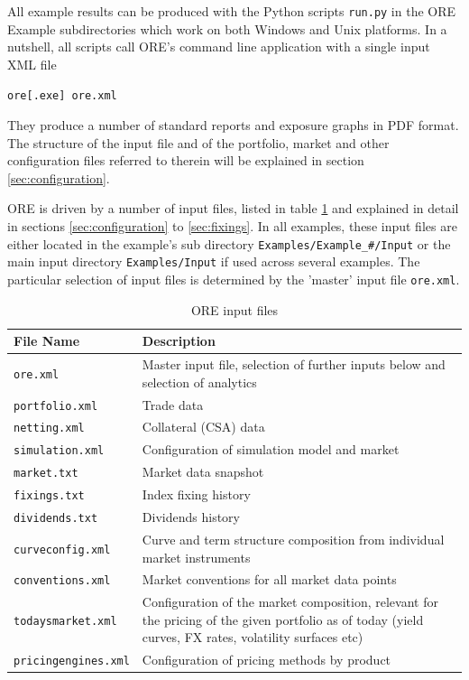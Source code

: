 All example results can be produced with the Python scripts {\tt run.py} in the ORE Example subdirectories
which work on both Windows and Unix platforms. In a nutshell, all scripts call ORE's command line application
with a single input XML file

\medskip
\centerline{\tt ore[.exe] ore.xml}
\medskip

They produce a number of standard reports and exposure graphs in PDF format. The structure of the input file and of the
portfolio, market and other configuration files referred to therein will be explained in section
\ref{sec:configuration}.

\medskip ORE is driven by a number of input files, listed in table \ref{tab_1} and explained in detail in sections
\ref{sec:configuration} to \ref{sec:fixings}. In all examples, these input files are either located in the example's sub
directory {\tt Examples/Example\_\#/Input} or the main input directory {\tt Examples/Input} if used across several
examples. The particular selection of input files is determined by the 'master' input file {\tt ore.xml}.

\begin{table}[h]
\scriptsize
\begin{center}
\begin{tabular}{|l|p{11cm}|}
  \hline
  File Name & Description \\
  \hline
  {\tt ore.xml}&   Master input file, selection of further inputs below and selection of analytics \\
  {\tt portfolio.xml} & Trade data \\
  {\tt netting.xml} &  Collateral (CSA) data \\
  {\tt simulation.xml} & Configuration of simulation model and market\\
  {\tt market.txt} &  Market data snapshot \\
  {\tt fixings.txt} &  Index fixing history \\
  {\tt dividends.txt} &  Dividends history \\
  {\tt curveconfig.xml} & Curve and term structure composition from individual market instruments\\
  {\tt conventions.xml} & Market conventions for all market data points\\
  {\tt todaysmarket.xml} &  Configuration of the market composition, relevant for the pricing of the given portfolio as
                           of today (yield curves, FX rates, volatility surfaces etc) \\
  {\tt pricingengines.xml} &  Configuration of pricing methods by product\\
  \hline
\end{tabular}
\end{center}
\caption{ORE input files}
\label{tab_1}
\end{table}

